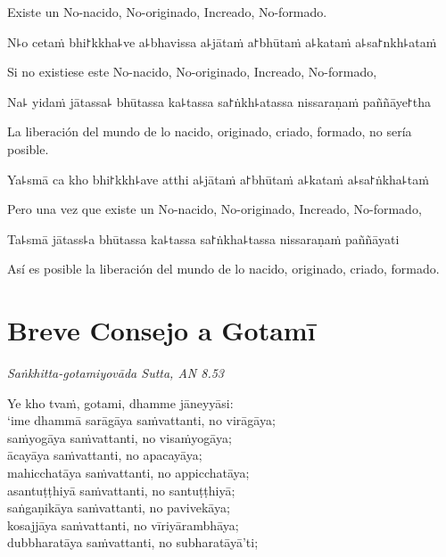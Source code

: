 \begin{english}
  Existe un No-nacido, No-originado, Increado, No-formado.
\end{english}

N꜕o cetaṁ bhi꜓kkha꜕ve a꜕bhavissa a꜕jātaṁ a꜓bhūtaṁ a꜕kataṁ a꜕sa꜓nkh꜕ataṁ

\begin{english}
 Si no existiese este No-nacido, No-originado, Increado, No-formado,
\end{english}

Na꜕ yidaṁ jātassa꜕ bhūtassa ka꜕tassa sa꜓ṅkh꜕atassa nissaraṇaṁ paññāye꜓tha

\begin{english}
  La liberación del mundo de lo nacido, originado, criado, formado, no sería posible.
\end{english}

Ya꜕smā ca kho bhi꜓kkh꜕ave atthi a꜕jātaṁ a꜓bhūtaṁ a꜕kataṁ a꜕sa꜓ṅkha꜕taṁ

\begin{english}
  Pero una vez que existe un No-nacido, No-originado, Increado, No-formado,
\end{english}

Ta꜕smā jātass꜕a bhūtassa ka꜕tassa sa꜓ṅkha꜕tassa nissaraṇaṁ paññāyati

\begin{english}
  Así es posible la liberación del mundo de lo nacido, originado, criado, formado.
\end{english}

\chapter[Breve Consejo a Gotamī]{Breve Consejo a Gotamī}

\emph{Saṅkhitta-gotamiyovāda Sutta, AN 8.53}


\begin{leader}
\end{leader}

Ye kho tvaṁ, gotami, dhamme jāneyyāsi:\\
‘ime dhammā sarāgāya saṁvattanti, no virāgāya;\\
saṁyogāya saṁvattanti, no visaṁyogāya;\\
ācayāya saṁvattanti, no apacayāya;\\
mahicchatāya saṁvattanti, no appicchatāya;\\
asantuṭṭhiyā saṁvattanti, no santuṭṭhiyā;\\
saṅgaṇikāya saṁvattanti, no pavivekāya;\\
kosajjāya saṁvattanti, no vīriyārambhāya;\\
dubbharatāya saṁvattanti, no subharatāyā’ti;


